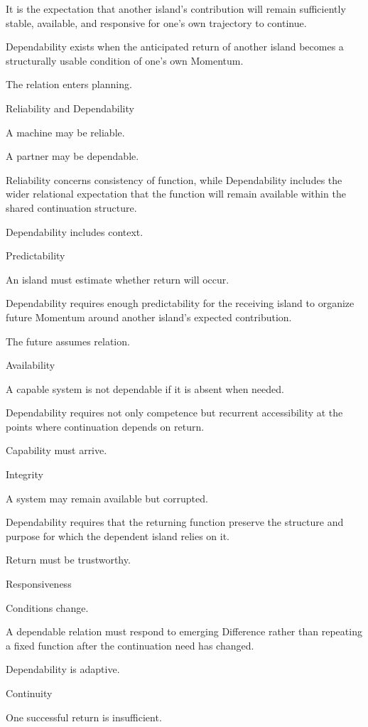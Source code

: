 It is the expectation that another island’s contribution will remain sufficiently stable, available, and responsive for one’s own trajectory to continue.

Dependability exists when the anticipated return of another island becomes a structurally usable condition of one’s own Momentum.

The relation enters planning.

Reliability and Dependability

A machine may be reliable.

A partner may be dependable.

Reliability concerns consistency of function, while Dependability includes the wider relational expectation that the function will remain available within the shared continuation structure.

Dependability includes context.

Predictability

An island must estimate whether return will occur.

Dependability requires enough predictability for the receiving island to organize future Momentum around another island’s expected contribution.

The future assumes relation.

Availability

A capable system is not dependable if it is absent when needed.

Dependability requires not only competence but recurrent accessibility at the points where continuation depends on return.

Capability must arrive.

Integrity

A system may remain available but corrupted.

Dependability requires that the returning function preserve the structure and purpose for which the dependent island relies on it.

Return must be trustworthy.

Responsiveness

Conditions change.

A dependable relation must respond to emerging Difference rather than repeating a fixed function after the continuation need has changed.

Dependability is adaptive.

Continuity

One successful return is insufficient.

